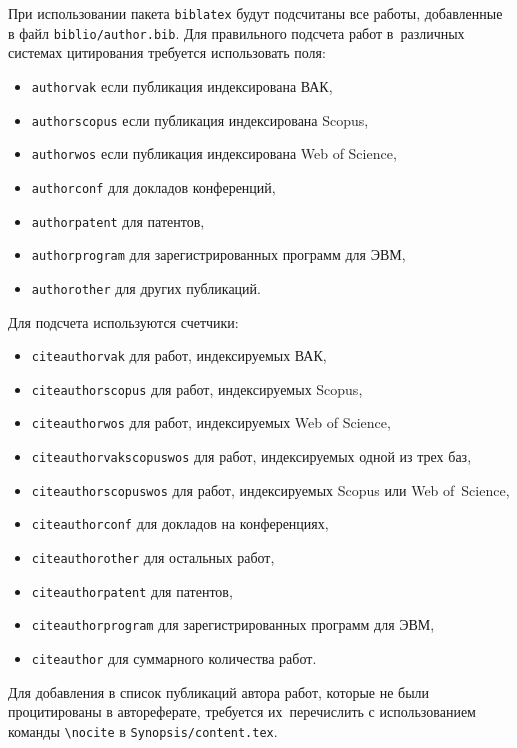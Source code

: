 При использовании пакета \verb!biblatex! будут подсчитаны все работы, добавленные
в файл \verb!biblio/author.bib!. Для правильного подсчета работ в~различных
системах цитирования требуется использовать поля:
\begin{itemize}
        \item \texttt{authorvak} если публикация индексирована ВАК,
        \item \texttt{authorscopus} если публикация индексирована Scopus,
        \item \texttt{authorwos} если публикация индексирована Web of Science,
        \item \texttt{authorconf} для докладов конференций,
        \item \texttt{authorpatent} для патентов,
        \item \texttt{authorprogram} для зарегистрированных программ для ЭВМ,
        \item \texttt{authorother} для других публикаций.
\end{itemize}
Для подсчета используются счетчики:
\begin{itemize}
        \item \texttt{citeauthorvak} для работ, индексируемых ВАК,
        \item \texttt{citeauthorscopus} для работ, индексируемых Scopus,
        \item \texttt{citeauthorwos} для работ, индексируемых Web of Science,
        \item \texttt{citeauthorvakscopuswos} для работ, индексируемых одной из трех баз,
        \item \texttt{citeauthorscopuswos} для работ, индексируемых Scopus или Web of~Science,
        \item \texttt{citeauthorconf} для докладов на конференциях,
        \item \texttt{citeauthorother} для остальных работ,
        \item \texttt{citeauthorpatent} для патентов,
        \item \texttt{citeauthorprogram} для зарегистрированных программ для ЭВМ,
        \item \texttt{citeauthor} для суммарного количества работ.
\end{itemize}

Для добавления в список публикаций автора работ, которые не были процитированы в
автореферате, требуется их~перечислить с использованием команды \verb!\nocite! в
\verb!Synopsis/content.tex!.
